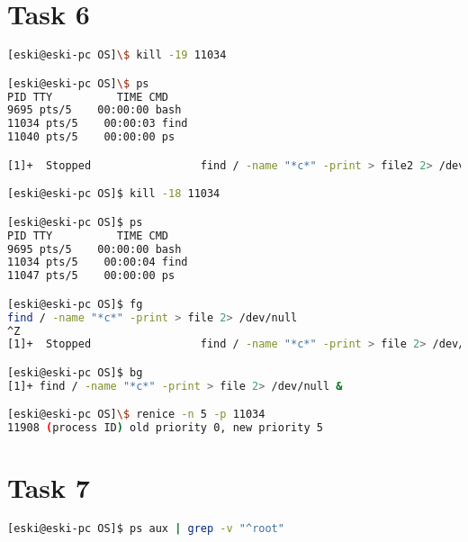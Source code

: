\documentclass{article}
\begin{document}
\section*{Task 6}\vspace{-3mm}
\begin{lstlisting}[language=BASH]
[eski@eski-pc OS]\$ kill -19 11034

[eski@eski-pc OS]\$ ps
PID TTY          TIME CMD
9695 pts/5    00:00:00 bash
11034 pts/5    00:00:03 find
11040 pts/5    00:00:00 ps

[1]+  Stopped                 find / -name "*c*" -print > file2 2> /dev/null

[eski@eski-pc OS]$ kill -18 11034

[eski@eski-pc OS]$ ps
PID TTY          TIME CMD
9695 pts/5    00:00:00 bash
11034 pts/5    00:00:04 find
11047 pts/5    00:00:00 ps

[eski@eski-pc OS]$ fg
find / -name "*c*" -print > file 2> /dev/null
^Z
[1]+  Stopped                 find / -name "*c*" -print > file 2> /dev/null

[eski@eski-pc OS]$ bg
[1]+ find / -name "*c*" -print > file 2> /dev/null &

[eski@eski-pc OS]\$ renice -n 5 -p 11034
11908 (process ID) old priority 0, new priority 5

\end{lstlisting}

\section*{Task 7}\vspace{-3mm}
\begin{lstlisting}[language=BASH]
[eski@eski-pc OS]$ ps aux | grep -v "^root"

\end{lstlisting}
\newpage
\end{document}

